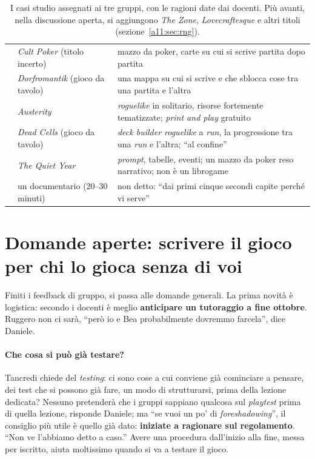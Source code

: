 \begin{table}[htbp]
\begin{tabular}{@{}p{2.1cm}p{3.6cm}p{7.6cm}@{}}
 & \emph{Cult Poker} (titolo incerto) & mazzo da poker, carte su cui si scrive partita
dopo partita \\
 & \emph{Dorfromantik} (gioco da tavolo) & una mappa su cui si scrive e che sblocca cose
tra una partita e l'altra \\
 & \emph{Austerity} & \emph{roguelike} in solitario, risorse fortemente tematizzate;
\emph{print and play} gratuito \\
 & \emph{Dead Cells} (gioco da tavolo) & \emph{deck builder roguelike} a \emph{run}, la
progressione tra una \emph{run} e l'altra; ``al confine'' \\
 & \emph{The Quiet Year} & \emph{prompt}, tabelle, eventi; un mazzo da poker reso
narrativo; non è un librogame \\
 & un documentario (20--30 minuti) & non detto: ``dai primi cinque secondi capite perché
vi serve'' \\
\bottomrule
\end{tabular}
\caption{I casi studio assegnati ai tre gruppi, con le ragioni date dai docenti. Più
avanti, nella discussione aperta, si aggiungono \emph{The Zone}, \emph{Lovecraftesque}
e altri titoli (sezione~\ref{a11:sec:rng}).}
\label{a11:tab:reference}
\end{table}

\section{Domande aperte: scrivere il gioco per chi lo gioca senza di voi}
\label{a11:sec:testing}

Finiti i feedback di gruppo, si passa alle domande generali. La prima novità è
logistica: secondo i docenti è meglio \textbf{anticipare un tutoraggio a fine ottobre}.
Ruggero non ci sarà, ``però io e Bea probabilmente dovremmo farcela'', dice Daniele.

\paragraph{Che cosa si può già testare?} Tancredi chiede del \emph{testing}: ci sono cose
a cui conviene già cominciare a pensare, dei test che si possono già fare, un modo di
strutturarsi, prima della lezione dedicata? Nessuno pretenderà che i gruppi sappiano
qualcosa sul \emph{playtest} prima di quella lezione, risponde Daniele; ma ``se vuoi un
po' di \emph{foreshadowing}'', il consiglio più utile è quello già dato: \textbf{iniziate
a ragionare sul regolamento}. ``Non ve l'abbiamo detto a caso.'' Avere una procedura
dall'inizio alla fine, messa per iscritto, aiuta moltissimo quando si va a testare il
gioco.

